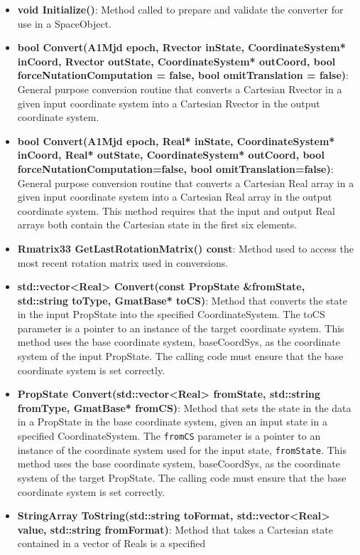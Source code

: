 \begin{itemize}
\item \textbf{void Initialize()}: Method called to prepare and validate the converter for use in a
SpaceObject.
\item \textbf{bool Convert(A1Mjd epoch, Rvector inState, CoordinateSystem* inCoord, Rvector
outState, CoordinateSystem* outCoord, bool forceNutationComputation = false, bool omitTranslation =
false)}: General purpose conversion routine that converts a Cartesian Rvector in a given input
coordinate system into a Cartesian Rvector in the output coordinate system.
\item \textbf{bool Convert(A1Mjd epoch, Real* inState, CoordinateSystem* inCoord, Real* outState,
CoordinateSystem* outCoord, bool forceNutationComputation=false, bool omitTranslation=false)}:
General purpose conversion routine that converts a Cartesian Real array in a given input
coordinate system into a Cartesian Real array in the output coordinate system.  This method
requires that the input and output Real arrays both contain the Cartesian state in the first six
elements.
\item \textbf{Rmatrix33 GetLastRotationMatrix() const}:  Method used to access the most recent
rotation matrix used in conversions.
\item \textbf{std::vector<Real> Convert(const PropState \&fromState, std::string toType, GmatBase*
toCS)}: Method that converts the state in the input PropState into the specified CoordinateSystem.
The toCS parameter is a pointer to an instance of the target coordinate system.  This method
uses the base coordinate system, baseCoordSys, as the coordinate system of the input PropState.
The calling code must ensure that the base coordinate system is set correctly.
\item \textbf{PropState Convert(std::vector<Real> fromState, std::string fromType, GmatBase*
fromCS)}: Method that sets the state in the data in a PropState in the base coordinate system,
given an input state in a specified CoordinateSystem.  The \texttt{fromCS} parameter is a pointer to
an instance of the coordinate system used for the input state, \texttt{fromState}.  This method
uses the base coordinate system, baseCoordSys, as the coordinate system of the target PropState.
The calling code must ensure that the base coordinate system is set correctly.
\item \textbf{StringArray ToString(std::string toFormat, std::vector<Real> value, std::string
fromFormat)}:  Method that takes a Cartesian state contained in a vector of Reals is a specified

\end{itemize}
